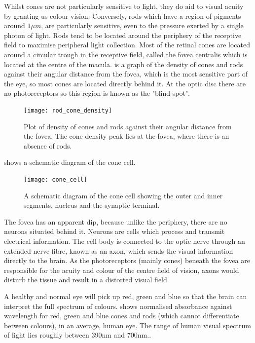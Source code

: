 Whilst cones are not particularly sensitive to light, they do aid to visual
acuity by granting us colour vision.\cite{bowmaker1980visual} Conversely, rods
which have a region of pigments around $1\mu{m}$, are particularly sensitive,
even to the pressure exerted by a single photon of light. Rods tend to be
located around the periphery of the receptive field to maximise peripheral light
collection.\cite{liebman1964sensitive,baylor1979responses} Most of the retinal
cones are located around a circular trough in the receptive field, called the
fovea centralis which is located at the centre of the macula.\cite{hendrickson1994primate}  is a graph of the density of cones and rods against their
angular distance from the fovea, which is the most sensitive part of the eye,
so most cones are located directly behind it. At the optic disc there are no 
photoreceptors so this region is known as the "blind spot".

\begin{figure}[!htbp]
 \centering
   \texttt{[image: rod\_cone\_density]}
 \caption{Plot of density of cones and rods against their angular distance from the fovea.
 The cone density peak lies at the fovea, where there is an absence of rods.
 \cite{rod_cone_density}}
 \label{fig:rod_cone_density}
\end{figure}


 shows a schematic diagram of the cone cell.

\begin{figure}[!htbp]
 \centering
   \texttt{[image: cone\_cell]}
 \caption{A schematic diagram of the cone cell showing the outer and inner segments, nucleus
 and the synaptic terminal.\cite{wikicone}}
 \label{fig:cone}
\end{figure}

The fovea has an apparent dip, because unlike the periphery,
there are no neurons situated behind it. Neurons are cells which process
and transmit electrical information. The cell body is connected to the optic
nerve through an extended nerve fibre, known as an axon, which sends the visual
information directly to the brain. As the photoreceptors (mainly cones) beneath
the fovea are responsible for the acuity and colour of the centre field of vision,
axons would disturb the tissue and result in a distorted visual field.

A healthy and normal eye will pick up red, green and blue so that the brain
can interpret the full spectrum of colours. 
shows normalised absorbance against wavelength for red, green and blue cones
and rods (which cannot differentiate between colours), in an average, human eye.
The range of human visual spectrum of light lies roughly between 390nm
and 700nm.\cite{starr2010biology}.

